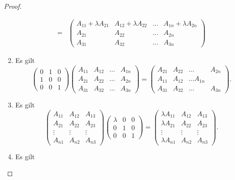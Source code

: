 \begin{proof}
\begin{parts}
\begin{enumerate}[label=(\arabic*)]
\begin{align*}
			=&\begin{pmatrix} A_{11}+\lambda A_{21} & A_{12}+\lambda A_{22} & \dots & A_{1n} +\lambda A_{2n} \\ A_{21} & A_{22} & \dots & A_{2n}\\ A_{31} & A_{32} & \dots & A_{3n}\end{pmatrix} 
		\end{align*}
	\item Es gilt
		\[
			\begin{pmatrix} 0 & 1 & 0 \\ 1 & 0 & 0 \\ 0 & 0 & 1 \end{pmatrix} \begin{pmatrix} A_{11} & A_{12} & \dots & A_{1n} \\ A_{21} & A_{22} & \dots & A_{2n} \\ A_{31} & A_{32} & \dots & A_{3n} \end{pmatrix}=\begin{pmatrix} A_{21} & A_{22} &\dots & A_{2n} \\ A_{11} & A_{12} & \dots A_{1n} \\ A_{31} & A_{32} & \dots & A_{3n} \end{pmatrix} 
		.\] 
	\item Es gilt
		\[
			\begin{pmatrix} A_{11} & A_{12} & A_{13} \\ A_{21} & A_{22} & A_{23} \\ \vdots & \vdots & \vdots \\ A_{n 1} & A_{n 2} & A_{n 3} \end{pmatrix}\begin{pmatrix} \lambda & 0 & 0 \\ 0 & 1 & 0 \\ 0 & 0 & 1 \end{pmatrix}=\begin{pmatrix}\lambda A_{11} & A_{12} & A_{13} \\ \lambda A_{21} & A_{22} & A_{23} \\ \vdots & \vdots & \vdots \\ \lambda A_{n 1} & A_{n 2} & A_{n 3}  \end{pmatrix}  
		.\] 
	\item Es gilt
		\[
\]
\end{enumerate}
\end{parts}
\end{proof}
